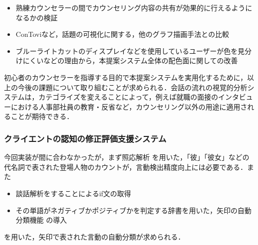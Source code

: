 \documentclass[shuuron]{kuee}
\begin{document}
\begin{itemize}
  \item 熟練カウンセラーの間でカウンセリング内容の共有が効果的に行えるようになるかの検証
  \item ConTovi\cite{el2016contovi}など，話題の可視化に関する，他のグラフ描画手法との比較
  \item ブルーライトカットのディスプレイなどを使用しているユーザーが色を見分けにくいなどの理由から，本提案システム全体の配色面に関しての改善
\end{itemize}

初心者のカウンセラーを指導する目的で本提案システムを実用化するために，以上の今後の課題について取り組むことが求められる．会話の流れの視覚的分析システムは，カテゴライズを変えることによって，例えば就職の面接のインタビューにおける人事部社員の教育・反省など，カウンセリング以外の用途に適用されることが期待できる．%

\subsubsection{クライエントの認知の修正評価支援システム}

今回実装が間に合わなかったが，まず照応解析\cite{sasano2009probabilistic} \cite{sasano2011discriminative}を用いた，「彼」「彼女」などの代名詞で表された登場人物のカウントが，言動検出精度向上には必要である．また
\begin{itemize}
  \item 談話解析をすることによるif文の取得\cite{kishimoto}
  \item その単語がネガティブかポジティブかを判定する辞書を用いた，矢印の自動分類機能\cite{小林のぞみ2005意見抽出のための評価表現の収集} \cite{東山昌彦2008述語の選択選好性に着目した名詞評価極性の獲得} の導入
\end{itemize}
を用いた，矢印で表された言動の自動分類が求められる．
\end{document}

